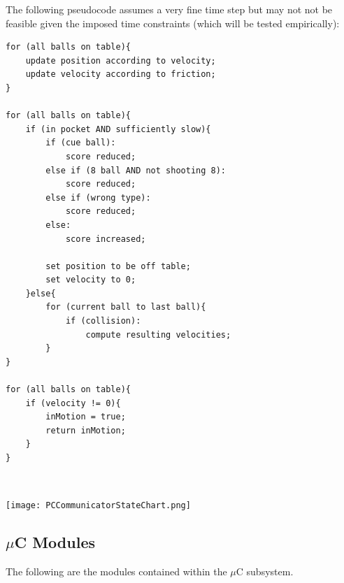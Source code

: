 \documentclass[titlepage]{article}
\begin{document}
The following pseudocode assumes a very fine time step but may not not be feasible given the imposed time constraints (which will be tested empirically):
\begin{lstlisting}
for (all balls on table){
	update position according to velocity;
	update velocity according to friction;
}

for (all balls on table){
	if (in pocket AND sufficiently slow){
		if (cue ball):
			score reduced;
		else if (8 ball AND not shooting 8):
			score reduced;
		else if (wrong type):
			score reduced;
		else:
			score increased;
			
		set position to be off table;
		set velocity to 0;
	}else{
		for (current ball to last ball){
			if (collision):
				compute resulting velocities;
		}
}

for (all balls on table){
	if (velocity != 0){
		inMotion = true;
		return inMotion;
	}
}
\end{lstlisting}~\\
\begin{center}
	\texttt{[image: PCCommunicatorStateChart.png]}
\label{fig:PCCommunicatorStateChart}
\end{center}
\newpage

\subsection{$\mu$C Modules}
The following are the modules contained within the $\mu$C subsystem.
\end{document}
